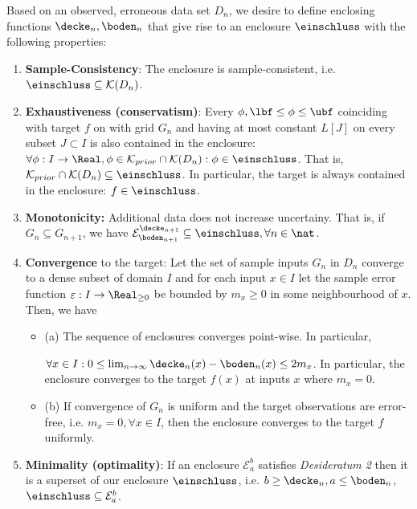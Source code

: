 \begin{defn}[Desiderata] \label{defn:desiderata}
 Based on an observed, erroneous data set $D_n$, we desire to define enclosing functions $\decke_n, \boden_n$ that give rise to an enclosure $\einschluss$ with the following properties:

\begin{enumerate} 

    \item \textbf{Sample-Consistency}: The enclosure is sample-consistent, i.e. $\einschluss \subseteq \mathcal K(D_n)$.
    
     \item \textbf{Exhaustiveness (conservatism)}: Every $\phi, \lbf \leq \phi \leq \ubf$ coinciding with target $f$ on with grid $G_n$ and
having at most constant $L[J]$ on every subset $J \subset I$ is also contained in the enclosure: $\forall \phi: I \to \Real, \phi \in \mathcal K_{prior} \cap \mathcal K(D_n): \phi \in \einschluss $. That is, $\mathcal K_{prior} \cap \mathcal K(D_n) \subseteq \einschluss$.
    In particular, the target is always contained in the enclosure: $f \in \einschluss$.

\item \textbf{Monotonicity:} Additional data does not increase uncertainy. That is,
if $G_n \subseteq G_{n+1} $, we have $\mathcal E^{\decke_{n+1}}_{\boden_{n+1}} \subseteq \einschluss, \forall n \in \nat$.
		   
\item \textbf{Convergence} to the target: Let the set of sample inputs $G_n$ in $D_n$ converge to a dense subset of domain $I$ and for each input $x \in I$ let the sample error function $\varepsilon: I \to \Real_{\geq 0}$ be bounded by $m_x \geq 0$ in some neighbourhood of $x$. Then, we have 
\begin{itemize}
\item (a) The sequence of enclosures converges point-wise. In particular, 

$\forall x \in I: 0 \leq \lim_{n \to \infty} \decke_n (x) -\boden_n(x) \leq 2 m_x$.
In particular, the enclosure converges to the target $f(x)$ at inputs $x$ where $m_x=0$.  
		
		\item (b) If convergence of $G_n$ is uniform and the target observations are error-free, i.e. $m_x = 0, \forall x \in I$, then the enclosure converges to the target $f$ uniformly.
\end{itemize}	
   \item \textbf{Minimality (optimality)}: 
If an enclosure $\mathcal E^b_a$  satisfies \emph{Desideratum 2} then it is a superset of our enclosure $\einschluss$, i.e. $b \geq \decke_n, a \leq \boden_n$, $\einschluss \subseteq \mathcal E^b_a$.    

\end{enumerate}

\end{defn}
 
